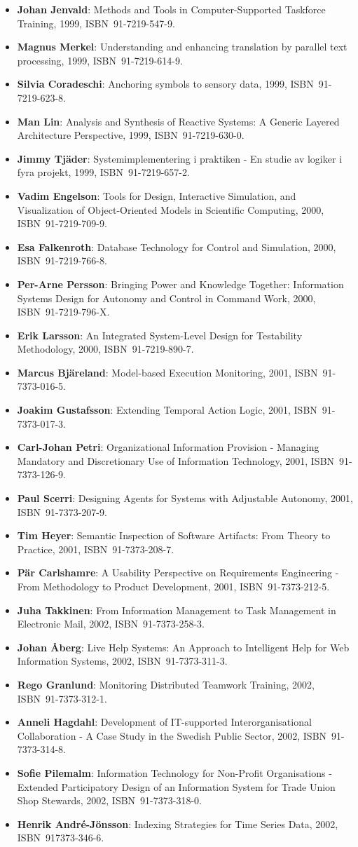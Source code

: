\documentclass[a4paper,showtrims,twocolumn]{memoir}
\newenvironment{theses}{
  \begin{itemize}
    \setlength{\itemsep}{0.2em}
    \setlength{\parskip}{0em}
    \setlength{\parsep}{0em}
}{
  \end{itemize}
}
\newcommand{\thesis}[5]{\item[No. #1] \textbf{#2}: #3, #4, ISBN~#5.}
\begin{document}
\begin{theses}
    \thesis{598}{Johan Jenvald}{Methods and Tools in Computer-Supported Taskforce Training}{1999}{91-7219-547-9}
    \thesis{607}{Magnus Merkel}{Understanding and enhancing translation by parallel text processing}{1999}{91-7219-614-9}
    \thesis{611}{Silvia Coradeschi}{Anchoring symbols to sensory data}{1999}{91-7219-623-8}
    \thesis{613}{Man Lin}{Analysis and Synthesis of Reactive Systems: A Generic Layered Architecture Perspective}{1999}{91-7219-630-0}
    \thesis{618}{Jimmy Tjäder}{Systemimplementering i praktiken - En studie av logiker i fyra projekt}{1999}{91-7219-657-2}
    \thesis{627}{Vadim Engelson}{Tools for Design, Interactive Simulation, and Visualization of Object-Oriented Models in Scientific Computing}{2000}{91-7219-709-9}
    \thesis{637}{Esa Falkenroth}{Database Technology for Control and Simulation}{2000}{91-7219-766-8}
    \thesis{639}{Per-Arne Persson}{Bringing Power and Knowledge Together: Information Systems Design for Autonomy and Control in Command Work}{2000}{91-7219-796-X}
    \thesis{660}{Erik Larsson}{An Integrated System-Level Design for Testability Methodology}{2000}{91-7219-890-7}
    \thesis{688}{Marcus Bjäreland}{Model-based Execution Monitoring}{2001}{91-7373-016-5}
    \thesis{689}{Joakim Gustafsson}{Extending Temporal Action Logic}{2001}{91-7373-017-3}
    \thesis{720}{Carl-Johan Petri}{Organizational Information Provision - Managing Mandatory and Discretionary Use of Information Technology}{2001}{91-7373-126-9}
    \thesis{724}{Paul Scerri}{Designing Agents for Systems with Adjustable Autonomy}{2001}{91-7373-207-9}
    \thesis{725}{Tim Heyer}{Semantic Inspection of Software Artifacts: From Theory to Practice}{2001}{91-7373-208-7}
    \thesis{726}{Pär Carlshamre}{A Usability Perspective on Requirements Engineering - From Methodology to Product Development}{2001}{91-7373-212-5}
    \thesis{732}{Juha Takkinen}{From Information Management to Task Management in Electronic Mail}{2002}{91-7373-258-3}
    \thesis{745}{Johan Åberg}{Live Help Systems: An Approach to Intelligent Help for Web Information Systems}{2002}{91-7373-311-3}
    \thesis{746}{Rego Granlund}{Monitoring Distributed Teamwork Training}{2002}{91-7373-312-1}
    \thesis{747}{Anneli Hagdahl}{Development of IT-supported Interorganisational Collaboration - A Case Study in the Swedish Public Sector}{2002}{91-7373-314-8}
    \thesis{749}{Sofie Pilemalm}{Information Technology for Non-Profit Organisations - Extended Participatory Design of an Information System for Trade Union Shop Stewards}{2002}{91-7373-318-0}
    \thesis{757}{Henrik André-Jönsson}{Indexing Strategies for Time Series Data}{2002}{917373-346-6}

\end{theses}
\end{document}
